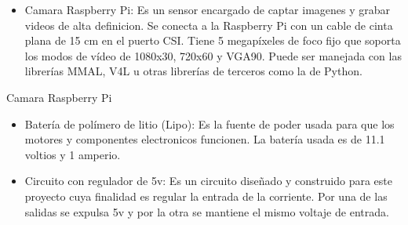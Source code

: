 \begin{itemize}
\item Camara Raspberry Pi: Es un sensor encargado de captar imagenes y grabar videos de alta definicion. Se conecta a la Raspberry Pi con un cable de cinta plana de 15 cm en el puerto CSI. Tiene 5 megapíxeles de foco fijo que soporta los modos de vídeo de 1080x30, 720x60 y VGA90. Puede ser manejada con las librerías MMAL, V4L u otras librerías de terceros como la de Python. %

\end{itemize}



Camara Raspberry Pi 
\begin{itemize}
\item Batería de polímero de litio (Lipo): Es la fuente de poder usada para que los motores y componentes electronicos funcionen. La batería usada es de 11.1 voltios y 1 amperio. 
\end{itemize}
\begin{itemize}
\item Circuito con regulador de 5v: Es un circuito diseñado y construido para este proyecto cuya finalidad es regular la entrada de la corriente. Por una de las salidas se expulsa 5v y por la otra se mantiene el mismo voltaje de entrada. 

\end{itemize}



